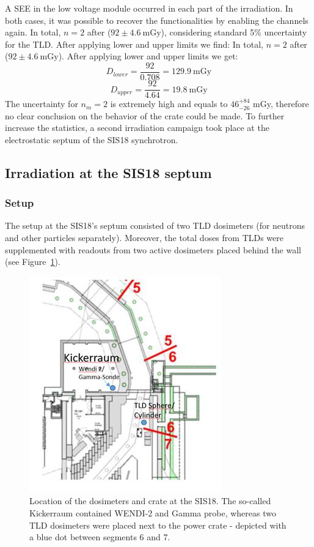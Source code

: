 A \gls{SEE} in the low voltage module occurred in each part of the irradiation. In both cases, it was possible to recover the functionalities by enabling the channels again. In total, $n=2$ after ($92\pm{4.6}\mathrm{\ mGy}$), considering standard 5\% uncertainty for the TLD. After applying lower and upper limits we find:
In total, $n=2$ after ($92\pm{4.6}\mathrm{\ mGy}$).
After applying lower and upper limits we get:
\begin{equation}
    D_{lower}=\frac{92}{0.708} = 129.9\mathrm{\ mGy}
\end{equation}
\begin{equation}
    D_{upper}=\frac{92}{4.64} = 19.8\mathrm{\ mGy}
\end{equation}
The uncertainty for $n_{m}=2$ is extremely high and equals to $\mathrm{46}_{-26}^{+84}$ mGy, therefore no clear conclusion on the behavior of the crate could be made. To further increase the statistics, a second irradiation campaign took place at the electrostatic septum of the SIS18 synchrotron. 
\subsection{Irradiation at the SIS18 septum}
\subsubsection{Setup}
The setup at the SIS18's septum consisted of two \gls{TLD} dosimeters (for neutrons and other particles separately). Moreover, the total doses from TLDs were supplemented with readouts from two active dosimeters placed behind the wall (see Figure~\ref{fig:spec_des}). 
\begin{figure}[!ht]
    \centering
    \includegraphics[width=0.45\columnwidth]{Chapter4/images/septum.jpg}
    \caption{Location of the dosimeters and crate at the SIS18. The so-called Kickerraum contained WENDI-2 and Gamma probe, whereas two TLD dosimeters were placed next to the power crate - depicted with a blue dot between segments 6 and 7.}
    \label{fig:spec_des}
\end{figure}

